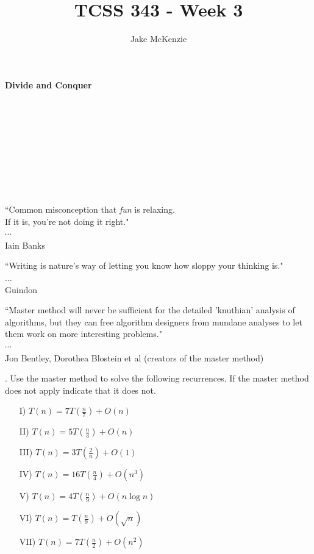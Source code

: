 \documentclass[12pt]{article}
\begin{document}
\title{TCSS 343 - Week 3}
\author{Jake McKenzie}
\maketitle
\noindent\centerline{\textbf{Divide and Conquer}}\\\\\\\\\\\\\\\\
\begin{center}
    ``Common misconception that \textit{fun} is relaxing. \\If it is, you’re not doing it right." \\$\cdots$\\ Iain Banks
\end{center}
\begin{center}
    ``Writing is nature's way of letting you know how sloppy your thinking is." \\
    $\dots$\\
    Guindon
\end{center}
\begin{center}
    ``Master method will never be sufficient for the detailed 'knuthian' analysis of algorithms, but they can free algorithm designers from mundane analyses to let them work on more interesting problems." \\$\cdots$\\ Jon Bentley, Dorothea Blostein et al (creators of the master method)  
\end{center}
. Use the master method to solve the following recurrences. If the master method does not apply indicate that it does not.
\begin{enumerate}
    \item[I)]$T(n) = 7T(\frac{n}{7}) + O(n)$
    \item[II)]$T(n) = 5T(\frac{n}{3}) + O(n)$
    \item[III)]$T(n) = 3T(\frac{2}{n}) + O(1)$
    \item[IV)]$T(n) = 16T(\frac{n}{4}) + O(n^3)$
    \item[V)]$T(n) = 4T(\frac{n}{9}) + O(n \log{n})$
    \item[VI)]$T(n) = T(\frac{n}{9}) + O(\sqrt{n})$
    \item[VII)]$T(n) = 7T(\frac{n}{2}) + O(n^2)$
\end{enumerate}
\newpage
\end{document}
